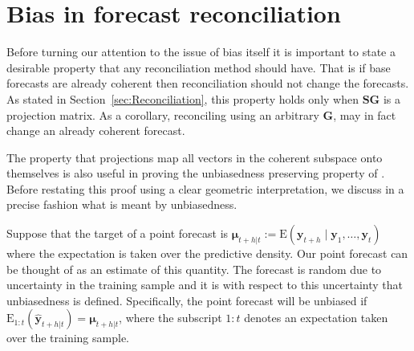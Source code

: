 \documentclass[12pt]{article}
\def\E{\text{E}}
\theoremstyle{definition}
\begin{document}
{%
%

}
\section{Bias in forecast reconciliation}\label{sec:BiasInRecon}

Before turning our attention to the issue of bias itself it is important to state a desirable property that any reconciliation method should have. That is if base forecasts are already coherent then reconciliation should not change the forecasts. As stated in Section~\ref{sec:Reconciliation}, this property holds only when $\bm{S}\bm{G}$ is a projection matrix. As a corollary, reconciling using an arbitrary $\bm{G}$, may in fact change an already coherent forecast.

The property that projections map all vectors in the coherent subspace onto themselves is also useful in proving the unbiasedness preserving property of \citet{WicEtAl2019}. Before restating this proof using a clear geometric interpretation, we discuss in a precise fashion what is meant by unbiasedness.

Suppose that the target of a point forecast is $\bm{\mu}_{t+h|t}:=\E(\bm{y}_{t+h}\mid\bm{y}_{1},\dots,\bm{y}_{t})$ where the expectation is taken over the predictive density. Our point forecast can be thought of as an estimate of this quantity. The forecast is random due to uncertainty in the training sample and it is with respect to this uncertainty that unbiasedness is defined. Specifically, the point forecast will be unbiased if $\E_{1:t}(\hat{\bm{y}}_{t+h|t})=\bm{\mu}_{t+h|t}$, where the subscript $1:t$ denotes an expectation taken over the training sample.
\end{document}
